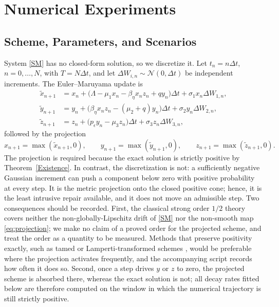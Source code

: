 \documentclass{article}
\newcommand{\betaeta}{\beta_\eta}
\newcommand{\peps}{p_\epsilon}
\begin{document}
\section{Numerical Experiments}\label{sec:numerics}

\subsection{Scheme, Parameters, and Scenarios}

System \eqref{SM} has no closed-form solution, so we discretize it. Let $t_n=n\Delta t$, $n=0,\dots,N$, with $T=N\Delta t$, and let $\Delta W_{i,n}\sim\mathcal{N}(0,\Delta t)$ be independent increments. The Euler--Maruyama update is
\begin{align}
\tilde{x}_{n+1} &= x_n + \big(\Lambda-\mu_1x_n-\betaeta x_nz_n+qy_n\big)\Delta t+\sigma_1x_n\Delta W_{1,n}, \label{eq:EM_x}\\
\tilde{y}_{n+1} &= y_n + \big(\betaeta x_nz_n-(\mu_2+q)y_n\big)\Delta t+\sigma_2y_n\Delta W_{2,n}, \label{eq:EM_y}\\
\tilde{z}_{n+1} &= z_n + \big(\peps y_n-\mu_3z_n\big)\Delta t+\sigma_3z_n\Delta W_{3,n}, \label{eq:EM_z}
\end{align}
followed by the projection
\begin{equation}\label{eq:projection}
x_{n+1}=\max(\tilde{x}_{n+1},0),\qquad y_{n+1}=\max(\tilde{y}_{n+1},0),\qquad z_{n+1}=\max(\tilde{z}_{n+1},0).
\end{equation}
The projection is required because the exact solution is strictly positive by Theorem~\ref{Existence}. In contrast, the discretization is not: a sufficiently negative Gaussian increment can push a component below zero with positive probability at every step. It is the metric projection onto the closed positive cone; hence, it is the least intrusive repair available, and it does not move an admissible step. Two consequences should be recorded. First, the classical strong order $1/2$ theory \citep{kloeden2013numerical} covers neither the non-globally-Lipschitz drift of \eqref{SM} nor the non-smooth map \eqref{eq:projection}; we make no claim of a proved order for the projected scheme, and treat the order as a quantity to be measured. Methods that preserve positivity exactly, such as tamed or Lamperti-transformed schemes \citep{higham2001algorithmic}, would be preferable where the projection activates frequently, and the accompanying script records how often it does so. Second, once a step drives $y$ or $z$ to zero, the projected scheme is absorbed there, whereas the exact solution is not; all decay rates fitted below are therefore computed on the window in which the numerical trajectory is still strictly positive.
\end{document}
